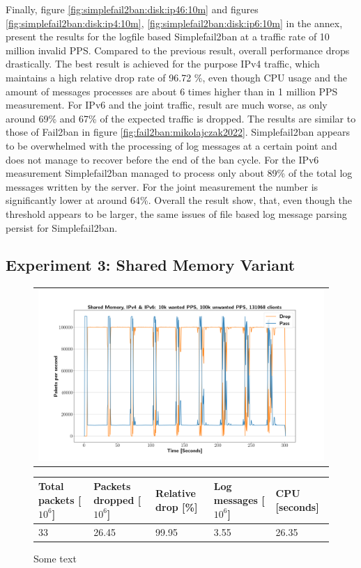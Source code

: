 Finally, figure \ref{fig:simplefail2ban:disk:ip46:10m} and figures \ref{fig:simplefail2ban:disk:ip4:10m}, \ref{fig:simplefail2ban:disk:ip6:10m} in the annex, present the results
for the logfile based Simplefail2ban at a traffic rate of 10 million invalid \ac{PPS}. Compared to the previous result, overall performance drops drastically. The best result is achieved for the purpose
\ac{IPv4} traffic, which maintains a high relative drop rate of 96.72 \%, even though CPU usage and the amount of messages processes are about 6 times 
higher than in 1 million \ac{PPS} measurement. For \ac{IPv6} and the joint traffic, result are much worse, as only around 69\% and 67\% of the expected traffic is dropped.
The results are similar to those of Fail2ban in figure \ref{fig:fail2ban:mikolajczak2022}. Simplefail2ban appears to be overwhelmed with the processing of log messages at a certain point and
does not manage to recover before the end of the ban cycle. For the \ac{IPv6} measurement Simplefail2ban managed to process only about 89\% of the total log messages written by the server. For the joint measurement
the number is significantly lower at around 64\%. Overall the result show, that, even though the threshold appears to be larger, the same issues of file based log message parsing persist for Simplefail2ban.

\pagebreak

\subsection{Experiment 3: Shared Memory Variant}


\begin{figure}[!h]
	\label{fig:simplefail2ban:shm:ip46:100k}
	\centering
	\scriptsize
	\begin{tabular}{c}
    	\centerline{\includegraphics[width=1.2\textwidth]{images/simplefail2ban_shm_ipv46_v10k_iv100k_c131068.png}}
	\end{tabular}
	\begin{tabular}{lllll}
		\toprule
		\textbf{Total packets [$10^6$]} & \textbf{Packets dropped [$10^6$]} & \textbf{Relative drop [\%]} & \textbf{Log messages [$10^6$]} & \textbf{CPU [seconds]} \\ \midrule 
		33 & 26.45 & 99.95 & 3.55 & 26.35 \\
		\bottomrule
	\end{tabular}
	\caption[Simplefail2ban, Shared Memory, IPv4 \& IPv6, 100k \ac{PPS}]{Some text}
\end{figure}

